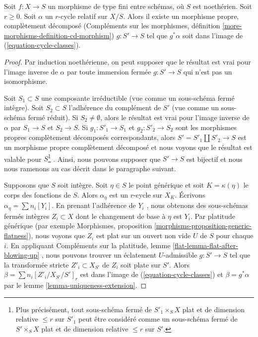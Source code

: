 \begin{lemma} 
\label{lemma-get-cycles} 
Soit  $f : X \to S$  un morphisme de type fini entre schémas, où $S$ est noethérien. 
Soit  $r \geq 0$. Soit  $\alpha$  un  $r$-cycle relatif sur $X/S$. Alors il existe un 
morphisme propre, complètement décomposé 
(Compléments sur les morphismes, définition  \ref{more-morphisms-definition-cd-morphism})
  $g : S' \to S$  tel que  $g^*\alpha$ soit dans l'image de 
(\ref{equation-cycle-classes}). 
\end{lemma} 

\begin{proof} 
Par induction noethérienne, on peut supposer que le résultat est vrai pour l'image inverse de 
$\alpha$  par toute immersion fermée  $g : S' \to S$  qui n'est pas un isomorphisme. 

\medskip\noindent
 Soit  $S_1 \subset S$  une composante irréductible (vue comme un sous-schéma fermé
 intègre). Soit  $S_2 \subset S$  l'adhérence du complément de  $S'$
  (vue comme un sous-schéma fermé réduit). Si  $S_2 \not = \emptyset$, alors
 le résultat est vrai pour l'image inverse de $\alpha$  par  $S_1 \to S$  et  $S_2 \to S$. 
Si  $g_1 : S'_1 \to S_1$ et  $g_2 : S'_2 \to S_2$
  sont les morphismes propres complètement décomposés correspondants, 
alors  $S' = S'_1 \amalg S'_2 \to S$
  est un morphisme propre complètement décomposé et nous 
voyons que le résultat est valable pour $S$\footnote{Plus précisément, tout 
sous-schéma fermé de $S'_1 \times_S X$ plat et de dimension relative  
$\leq r$  sur  $S'_1$  peut être considéré comme un sous-schéma fermé de  $S' \times_S X$
  plat et de dimension relative  $\leq r$  sur  $S'$.} 
. Ainsi, nous pouvons supposer que  $S' \to S$  est bijectif
 et nous nous ramenons au cas décrit dans le paragraphe suivant. 

\medskip\noindent
 Supposons que  $S$  soit intègre. Soit  $\eta \in S$  le point générique 
et soit  $K = \kappa(\eta)$  le corps des fonctions de  $S$. 
Alors  $\alpha_\eta$  est un  $r$-cycle sur  $X_K$. 
Écrivons  $\alpha_\eta = \sum n_i[Y_i]$.
 En prenant l'adhérence de  $Y_i$ , nous obtenons des sous-schémas fermés intègres 
$Z_i \subset X$  dont le changement de base à  $\eta$  est  $Y_i$.
 Par platitude générique (par exemple Morphismes,
 proposition  \ref{morphisms-proposition-generic-flatness}), nous
 voyons que  $Z_i$  est plat sur un ouvert non vide  $U$  de  $S$  pour chaque  $i$. 
En appliquant Compléments sur la platitude, lemme \ref{flat-lemma-flat-after-blowing-up} , nous pouvons 
trouver un éclatement  $U$-admissible  $g : S' \to S$
 tel que la transformée stricte  $Z'_i \subset X_{S'}$
  de  $Z_i$  soit plate sur $S'$. Alors  $\beta = \sum n_i[Z'_i/X_{S'}/S']_r$
  est dans l'image de (\ref{equation-cycle-classes}) et $\beta = g^*\alpha$
  par le lemme \ref{lemma-uniqueness-extension}. 


\end{proof}
